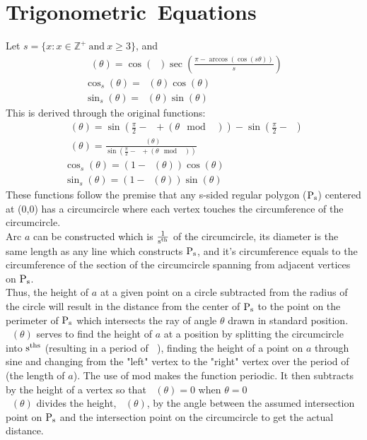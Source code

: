 \documentclass[11pt]{article}
\DeclareMathOperator{\custd}{\mathrm{d}_s}
\DeclareMathOperator{\custh}{\mathrm{h}_s}
\DeclareMathOperator{\period}{\frac{2\pi}{s}}
\DeclareMathOperator{\hp}{\frac{\pi}{s}}
\begin{document}
\section{Trigonometric\ Equations}
Let \(s=\{x:x\in\mathbb{Z}^+\ \mathrm{and}\ x\geq3\}\), and
\begin{gather*}
\custd(\theta)=\cos(\hp)\sec(\frac{\pi - \arccos(\cos(s\theta))}{s})\\
\cos_s(\theta)=\custd(\theta)\cos(\theta)\\
\sin_s(\theta)=\custd(\theta)\sin(\theta)
\end{gather*}
This is derived through the original functions:
\begin{gather*}
\custh(\theta)=\sin(\frac{\pi}{2}-\hp+(\theta\mod\period))-\sin(\frac{\pi}{2}-\hp)\\
\custd(\theta)=\frac{\custh(\theta)}{\sin(\frac{\pi}{2}-\hp+(\theta\mod\period))}\\
\cos_s(\theta)=(1-\custd(\theta))\cos(\theta)\\
\sin_s(\theta)=(1-\custd(\theta))\sin(\theta)
\end{gather*}
These functions follow the premise that any s-sided regular polygon (\(\rm P_s\)) centered at (0,0) has a circumcircle where each vertex touches the circumference of the circumcircle. \\
Arc \(a\) can be constructed which is \(\rm \frac{1}{s^{th}}\) of the circumcircle, its diameter is the same length as any line which constructs \(\rm P_s\), and it's circumference equals to the circumference of the section of the circumcircle spanning from adjacent vertices on \(\rm P_s\). \\
Thus, the height of \(a\) at a given point on a circle subtracted from the radius of the circle will result in the distance from the center of \(\rm P_s\) to the point on the perimeter of \(\rm P_s\) which intersects the ray of angle \(\theta\) drawn in standard position.\\
\(\custh(\theta)\) serves to find the height of \(a\) at a position by splitting the circumcircle into \(\rm s^{ths}\) (resulting in a period of \(\period\)), finding the height of a point on \(a\) through sine and changing from the "left" vertex to the "right" vertex over the period of \(\period\) (the length of \(a\)). The use of mod makes the function periodic. It then subtracts by the height of a vertex so that \(\custh(\theta)=0\) when \(\theta=0\)\\
\(\custd(\theta)\) divides the height, \(\custh(\theta)\), by the angle between the assumed intersection point on \(\rm P_s\) and the intersection point on the circumcircle to get the actual distance.\\
\end{document}
